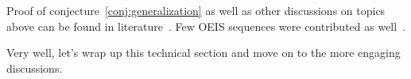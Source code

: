 Proof of conjecture~\eqref{conj:generalization} as well as other discussions on topics above can be found
in literature~\cite{alekseyev2018mathoverflow, kolosov2024history, kolosov2016link, kolosov2022_an_unusual_identity, kolosov2023polynomial}.
Few OEIS sequences were contributed as well~\cite{oeis_kolosov2017third, oeis_kolosov2018fifth,
    oeis_kolosov2018coefficientspolynomial3, oeis_kolosov2018coefficientspolynomial2,
    oeis_kolosov2018coefficientspolynomial1}.

Very well, let's wrap up this technical section and move on to the more engaging discussions.

